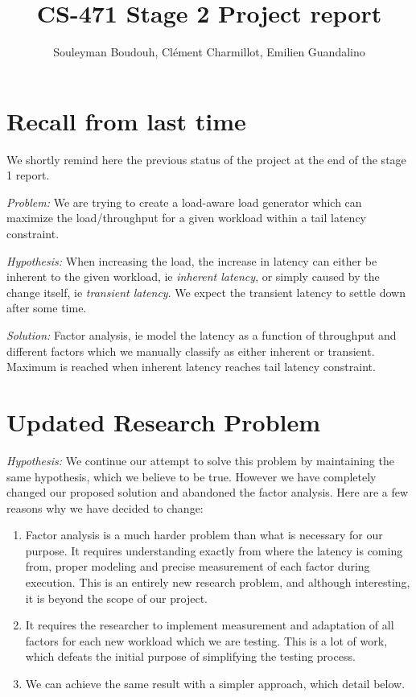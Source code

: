 \documentclass[12pt]{article}
\author{
  Souleyman Boudouh, Clément Charmillot, Emilien Guandalino\\
}
\begin{document}
\title{CS-471 Stage 2 Project report}
\date{}
\maketitle

\vspace{-3em}

\section{Recall from last time}

We shortly remind here the previous status of the project at the end of the stage 1 report.

\vspace{0.5em}

\noindent \textit{Problem:} We are trying to create a load-aware load generator which can maximize the load/throughput for a given workload within a tail latency constraint.

\vspace{0.5em}

\noindent \textit{Hypothesis:} When increasing the load, the increase in latency can either be inherent to the given workload, ie \textit{inherent latency}, or simply caused by the change itself, ie \textit{transient latency}. We expect the transient latency to settle down after some time.

\vspace{0.5em}

\noindent \textit{Solution:} Factor analysis, ie model the latency as a function of throughput and different factors which we manually classify as either inherent or transient. Maximum is reached when inherent latency reaches tail latency constraint.

\section{Updated Research Problem}

\textit{Hypothesis:} We continue our attempt to solve this problem by maintaining the same hypothesis, which we believe to be true. However we have completely changed our proposed solution and abandoned the factor analysis. Here are a few reasons why we have decided to change:

\begin{enumerate}
	\item Factor analysis is a much harder problem than what is necessary for our purpose. It requires understanding exactly from where the latency is coming from, proper modeling and precise measurement of each factor during execution. This is an entirely new research problem, and although interesting, it is beyond the scope of our project.
	\item  It requires the researcher to implement measurement and adaptation of all factors for each new workload which we are testing. This is a lot of work, which defeats the initial purpose of simplifying the testing process.
	\item We can achieve the same result with a simpler approach, which detail below.
\end{enumerate}
\end{document}
